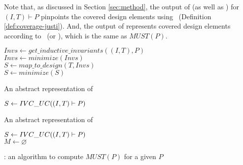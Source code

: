 
Note that, as discussed in Section \ref{sec:method}, the
output of \ucalg (as well as \ucbfalg) for $(I, T) \vdash P$ pinpoints the covered design elements
using \ivccov\ (Definition \ref{def:coverage-justi}).
And, the output of \mustalg represents covered design elements according to \nondetcovalt\ (or \nondetcov ), which is the same as $MUST(P)$.

\begin{algorithm}
  \BlankLine
  $Invs \leftarrow get\_inductive\_invariants((I, T), P)$ \\
  $Invs \leftarrow minimize(Invs)$ \\
  $S \leftarrow map\_to\_design (T, Invs)$ \\
  $S \leftarrow minimize(S)$ \\
\caption{An abstract representation of \ucalg \cite{Ghass16}}
\label{alg:uc}
\end{algorithm}

\begin{algorithm}
  \BlankLine
  $S \leftarrow {IVC\_UC}((I, T) \vdash P)$ \\
   {
  }
\caption{An abstract representation of \ucbfalg \cite{Ghass16}}
\label{alg:ucbf}
\end{algorithm}


\begin{algorithm}
  \BlankLine
  $S \leftarrow {IVC\_UC}((I, T) \vdash P)$ \\
  $M \leftarrow \varnothing$ \\
   {
  }
\caption{\mustalg: an algorithm to compute $MUST(P)$ for a given $P$}
\label{alg:must}
\end{algorithm}

